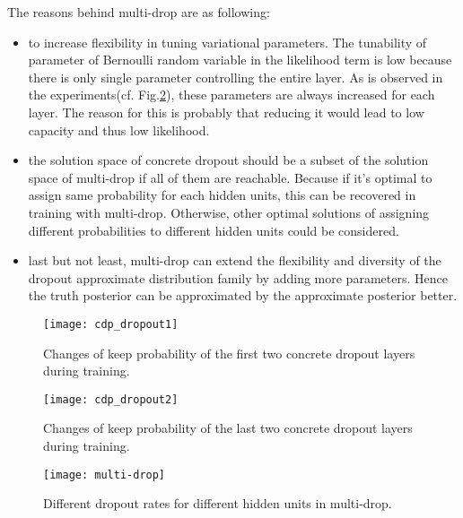 The reasons behind multi-drop are as following:
\begin{itemize}
\item to increase flexibility in tuning variational parameters. The tunability of parameter of Bernoulli random variable in the likelihood term is low because there is only single parameter controlling the entire layer. As is observed in the experiments(cf. Fig.\ref{fig:cdp_dropout2}), these parameters are always increased for each layer. The reason for this is probably that reducing it would lead to low capacity and thus low likelihood. 

\item the solution space of concrete dropout should be a subset of the solution space of multi-drop if all of them are reachable. Because if it's optimal to assign same probability for each hidden units, this can be recovered in training with multi-drop. Otherwise, other optimal solutions of assigning different probabilities to different hidden units could be considered.

\item last but not least, multi-drop can extend the flexibility and diversity of the dropout approximate distribution family by adding more parameters. Hence the truth posterior can be approximated by the approximate posterior better.
 
\end{itemize}


\begin{figure}[H]
	\begin{center}
		\texttt{[image: cdp\_dropout1]}	
		\caption{Changes of keep probability of the first two concrete dropout layers during training.}
		\label{fig:cdp_dropout1}
	\end{center}
\end{figure}
\begin{figure}[H]
	\begin{center}
		\texttt{[image: cdp\_dropout2]}	
		\label{fig:cdp_dropout2}
		\caption{Changes of keep probability of the last two concrete dropout layers during training.}
	\end{center}
\end{figure}
\begin{figure}[H]
	\begin{center}
		\centering
		\texttt{[image: multi-drop]}
		\caption{Different dropout rates for different hidden units in multi-drop.}		
		\label{fig:multi-drop}
	\end{center}
\end{figure}


